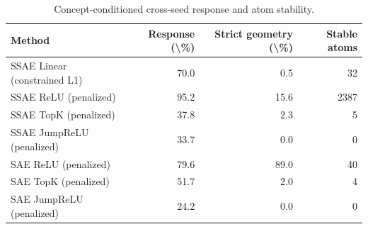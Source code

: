\begin{table}[t]
\centering
\caption{Concept-conditioned cross-seed response and atom stability.}
\label{tab:feature-atlas-cross-seed-stability}
\begin{tabular}{lrrr}
\toprule
Method & Response (\textbackslash{}\%) & Strict geometry (\textbackslash{}\%) & Stable atoms \\
\midrule
SSAE Linear (constrained L1) & 70.0 & 0.5 & 32 \\
SSAE ReLU (penalized) & 95.2 & 15.6 & 2387 \\
SSAE TopK (penalized) & 37.8 & 2.3 & 5 \\
SSAE JumpReLU (penalized) & 33.7 & 0.0 & 0 \\
SAE ReLU (penalized) & 79.6 & 89.0 & 40 \\
SAE TopK (penalized) & 51.7 & 2.0 & 4 \\
SAE JumpReLU (penalized) & 24.2 & 0.0 & 0 \\
\bottomrule
\end{tabular}
\end{table}
